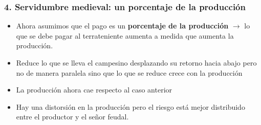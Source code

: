 \documentclass{beamer}
\begin{document}
\begin{frame}
\frametitle{4. Servidumbre medieval: un porcentaje de la producción }
\begin{itemize}
    \item Ahora asumimos que el pago es un \textbf{porcentaje de la producción} $\rightarrow$ lo que se debe pagar al terrateniente aumenta a medida que aumenta la producción.
    \item Reduce lo que se lleva el campesino desplazando su retorno hacia abajo pero no de manera paralela sino que lo que se reduce crece con la producción
    \item La producción ahora cae respecto al caso anterior
     \item Hay una distorsión en la producción pero el riesgo está mejor distribuido entre el productor y el señor feudal. 
\end{itemize}
\end{frame}
\end{document}
